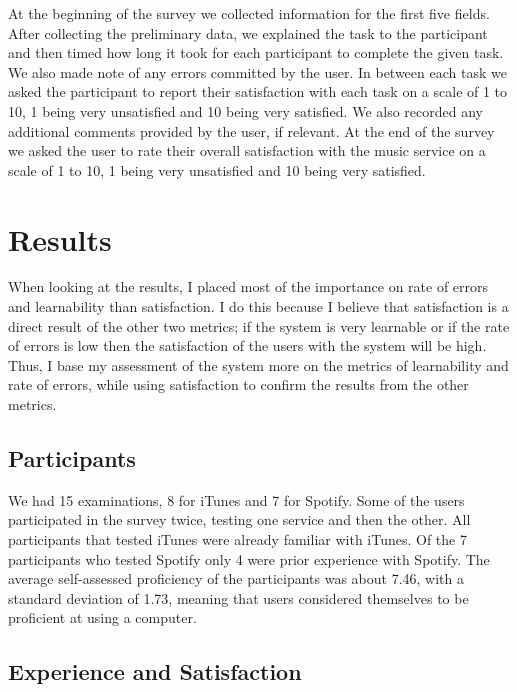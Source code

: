 \documentclass[11pt]{article}
\begin{document}
 
At the beginning of the survey we collected information for the first five fields. After collecting the preliminary data, we explained the task to the participant and then timed how long it took for each participant to complete the given task. We also made note of any errors committed by the user. In between each task we asked the participant to report their satisfaction with each task on a scale of 1 to 10, 1 being very unsatisfied and 10 being very satisfied. We also recorded any additional comments provided by the user, if relevant. At the end of the survey we asked the user to rate their overall satisfaction with the music service on a scale of 1 to 10, 1 being very unsatisfied and 10 being very satisfied.
\section{Results}
When looking at the results, I placed most of the importance on rate of errors and learnability
than satisfaction. I do this because I believe that satisfaction is a direct result of the other two metrics; if the system is very learnable or if the rate of errors is low then the satisfaction of the users with the system will be high. Thus, I base my assessment of the system more on the metrics of learnability and rate of errors, while using satisfaction to confirm the results from the other metrics.
\subsection{Participants}
We had 15 examinations, 8 for iTunes and 7 for Spotify. Some of the users participated in the survey twice, testing one service and then the other.  All participants that tested iTunes were already familiar with iTunes. Of the 7 participants who tested Spotify only 4 were prior experience with Spotify. The average self-assessed proficiency of the participants was about 7.46, with a standard deviation of 1.73, meaning that users considered themselves to be proficient at using a computer. 


\subsection{Experience and Satisfaction}
\end{document}
